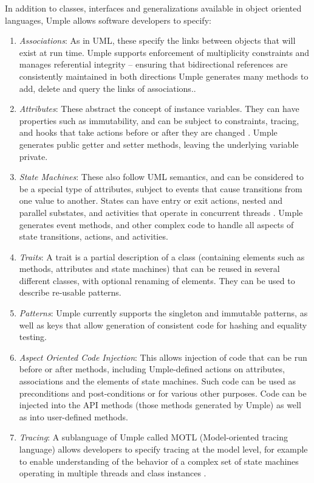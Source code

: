 In addition to classes, interfaces and generalizations available in object oriented languages, Umple allows software developers to specify:
\begin{enumerate}

 \item 	\textit{Associations}: As in UML, these specify the links between objects that will exist at run time. Umple supports enforcement of multiplicity constraints and manages referential integrity – ensuring that bidirectional references are consistently maintained in both directions \cite{UmpleAssociations} Umple generates many methods to add, delete and query the links of associations..

 \item 	\textit{Attributes}: These abstract the concept of instance variables. They can have properties such as immutability, and can be subject to constraints, tracing, and hooks that take actions before or after they are changed \cite{UmpleAttributes}. Umple generates public getter and setter methods, leaving the underlying variable private.
 
 \item \textit{	State Machines}: These also follow UML semantics, and can be considered to be a special type of attributes, subject to events that cause transitions from one value to another. States can have entry or exit actions, nested and parallel substates, and activities that operate in concurrent threads \cite{Badreddin2012_Thesis}. Umple generates event methods, and other complex code to handle all aspects of state transitions, actions, and activities.
 
 \item 	\textit{Traits}: A trait is a partial description of a class (containing elements such as methods, attributes and state machines) that can be reused in several different classes, with optional renaming of elements. They can be used to describe re-usable patterns.

 \item 	\textit{Patterns}: Umple currently supports the singleton and immutable patterns, as well as keys that allow generation of consistent code for hashing and equality testing.

 \item 	\textit{Aspect Oriented Code Injection}: This allows injection of code that can be run before or after methods, including Umple-defined actions on attributes, associations and the elements of state machines. Such code can be used as preconditions and post-conditions or for various other purposes. Code can be injected into the API methods (those methods generated by Umple) as well as into user-defined methods. 
 \item 	\textit{Tracing}:  A sublanguage of Umple called MOTL (Model-oriented tracing language) allows developers to specify tracing at the model level, for example to enable understanding of the behavior of a complex set of state machines operating in multiple threads and class instances \cite{UmpleTracing}.


\end{enumerate}
